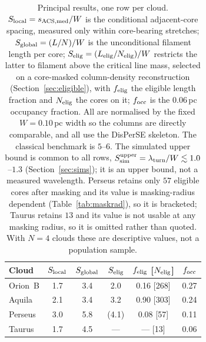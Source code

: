 \documentclass[usenatbib,twoside,twocolumn]{mnras}
\begin{document}
\begin{table}
\caption{Principal results, one row per cloud. $S_{\rm local}=s_{\rm ACS,med}/W$ is the conditional adjacent-core spacing, measured only within core-bearing stretches; $S_{\rm global}=(L/N)/W$ is the unconditional filament length per core; $S_{\rm elig}=(L_{\rm elig}/N_{\rm elig})/W$ restricts the latter to filament above the critical line mass, selected on a core-masked column-density reconstruction (Section~\ref{sec:eligible}), with $f_{\rm elig}$ the eligible length fraction and $N_{\rm elig}$ the cores on it; $f_{\rm occ}$ is the $0.06$\,pc occupancy fraction. All are normalised by the fixed $W=0.10$\,pc width so the columns are directly comparable, and all use the DisPerSE skeleton. The classical benchmark is $5$--$6$. The simulated upper bound is common to all rows, $S_{\rm sim}^{\rm upper}=\lambda_{\rm turn}/W\lesssim1.0$--$1.3$ (Section~\ref{sec:sims}); it is an upper bound, not a measured wavelength. Perseus retains only $57$ eligible cores after masking and its value is masking-radius dependent (Table~\ref{tab:maskrad}), so it is bracketed; Taurus retains $13$ and its value is not usable at any masking radius, so it is omitted rather than quoted. With $N=4$ clouds these are descriptive values, not a population sample.}
\label{tab:principal}
\footnotesize
\setlength{\tabcolsep}{4pt}
\begin{tabular}{lccccc}
\toprule
Cloud & $S_{\rm local}$ & $S_{\rm global}$ & $S_{\rm elig}$ & $f_{\rm elig}$ [$N_{\rm elig}$] & $f_{\rm occ}$ \\
\midrule
Orion~B & 1.7 & 3.4 & 2.0    & 0.16 [268] & 0.27 \\
Aquila  & 2.1 & 3.4 & 3.2    & 0.90 [303] & 0.24 \\
Perseus & 3.0 & 5.8 & (4.1)  & 0.08 [57]  & 0.11 \\
Taurus  & 1.7 & 4.5 & ---    & --- [13]   & 0.06 \\
\bottomrule
\end{tabular}
\end{table}
\end{document}
